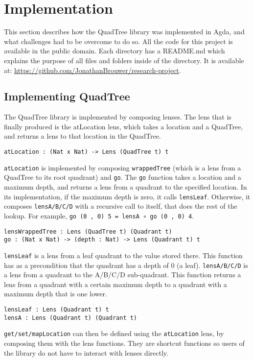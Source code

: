 \section{Implementation} \label{implementation}
This section describes how the QuadTree library was implemented in Agda, and what challenges had to be overcome to do so. All the code for this project is available in the public domain. Each directory has a README.md which explains the purpose of all files and folders inside of the directory.
It is available at: \textcolor{blue}{\href{https://github.com/JonathanBrouwer/research-project}{https://github.com/JonathanBrouwer/research-project}}. 

\subsection{Implementing QuadTree}
The QuadTree library is implemented by composing lenses. The lens that is finally produced is the atLocation lens, which takes a location and a QuadTree, and returns a lens to that location in the QuadTree.
\begin{verbatim}
atLocation : (Nat x Nat) -> Lens (QuadTree t) t
\end{verbatim}
 \verb|atLocation| is implemented by composing \verb|wrappedTree| (which is a lens from a QuadTree to its root quadrant) and  \verb|go|.   The \verb|go| function takes a location and a maximum depth, and returns a lens from a quadrant to the specified location. In its implementation, if the maximum depth is zero, it calls  \verb|lensLeaf|. Otherwise, it composes  \verb|lensA/B/C/D| with a recursive call to itself, that does the rest of the lookup. For example, \verb|go (0 , 0) 5 = lensA ∘ go (0 , 0) 4|.
\begin{verbatim}
lensWrappedTree : Lens (QuadTree t) (Quadrant t)
go : (Nat x Nat) -> (depth : Nat) -> Lens (Quadrant t) t
\end{verbatim}
 \verb|lensLeaf| is a lens from a leaf quadrant to the value stored there. This function has as a precondition that the quadrant has a depth of 0 (a leaf).  \verb|lensA/B/C/D| is a lens from a quadrant to the A/B/C/D sub-quadrant. This function returns a lens from a quadrant with a certain maximum depth to a quadrant with a maximum depth that is one lower. 
\begin{verbatim}
lensLeaf : Lens (Quadrant t) t
lensA : Lens (Quadrant t) (Quadrant t)
\end{verbatim}
 \verb|get/set/mapLocation| can then be defined using the  \verb|atLocation| lens, by composing them with the lens functions. They are shortcut functions so users of the library do not have to interact with lenses directly.
